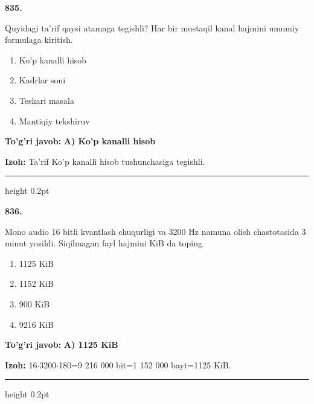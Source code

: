 \documentclass[10pt,a4paper,oneside]{article}
\begin{document}
\noindent\textbf{\color{ink}835.}
\par
Quyidagi ta'rif qaysi atamaga tegishli? Har bir mustaqil kanal hajmini umumiy formulaga kiritish.
\begin{enumerate}[label=\Alph*),leftmargin=9mm]
\item Ko'p kanalli hisob
\item Kadrlar soni
\item Teskari masala
\item Mantiqiy tekshiruv
\end{enumerate}
\begin{tcolorbox}[enhanced,breakable,colback=teal!4,colframe=teal!50!black,boxrule=0.5pt,arc=1.1mm,left=3mm,right=3mm,top=1.7mm,bottom=1.7mm,before skip=2mm,after skip=2mm]
\textbf{\color{teal}To'g'ri javob:} \textbf{A) Ko'p kanalli hisob}
\par\smallskip
\textbf{Izoh:} Ta'rif Ko'p kanalli hisob tushunchasiga tegishli.
\end{tcolorbox}
\vspace{2mm}\hrule height 0.2pt \vspace{3mm}

\noindent\textbf{\color{ink}836.}
\par
Mono audio 16 bitli kvantlash chuqurligi va 3200 Hz namuna olish chastotasida 3 minut yozildi. Siqilmagan fayl hajmini KiB da toping.
\begin{enumerate}[label=\Alph*),leftmargin=9mm]
\item 1125 KiB
\item 1152 KiB
\item 900 KiB
\item 9216 KiB
\end{enumerate}
\begin{tcolorbox}[enhanced,breakable,colback=teal!4,colframe=teal!50!black,boxrule=0.5pt,arc=1.1mm,left=3mm,right=3mm,top=1.7mm,bottom=1.7mm,before skip=2mm,after skip=2mm]
\textbf{\color{teal}To'g'ri javob:} \textbf{A) 1125 KiB}
\par\smallskip
\textbf{Izoh:} 16\ensuremath{\cdot}3200\ensuremath{\cdot}180=9 216 000 bit=1 152 000 bayt=1125 KiB.
\end{tcolorbox}
\vspace{2mm}\hrule height 0.2pt \vspace{3mm}
\end{document}
